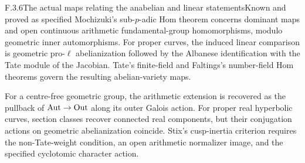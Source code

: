 \begin{result}{F.3.6}{The actual maps relating the anabelian and linear statements}{Known and proved as specified}
Mochizuki's sub-$p$-adic Hom theorem concerns dominant maps and open continuous arithmetic fundamental-group homomorphisms, modulo geometric inner automorphisms. For proper curves, the induced linear comparison is geometric pro-$\ell$ abelianization followed by the Albanese identification with the Tate module of the Jacobian. Tate's finite-field and Faltings's number-field Hom theorems govern the resulting abelian-variety maps.

For a centre-free geometric group, the arithmetic extension is recovered as the pullback of $\operatorname{Aut}\to\operatorname{Out}$ along its outer Galois action. For proper real hyperbolic curves, section classes recover connected real components, but their conjugation actions on geometric abelianization coincide. Stix's cusp-inertia criterion requires the non-Tate-weight condition, an open arithmetic normalizer image, and the specified cyclotomic character action.
\end{result}
